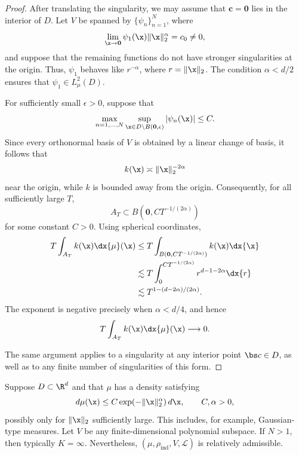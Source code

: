 \documentclass[10pt,dvipsnames]{amsart}
\begin{document}
\begin{proof}
After translating the singularity, we may assume that \(\mathbf{c}=\mathbf{0}\) lies in the
interior of \(D\). Let \(V\) be spanned by
\(\{\psi_n\}_{n=1}^N\), where
\[
  \lim_{\x \to \mathbf{0}} \psi_1(\x) \| \x\|_2^\alpha = c_0 \neq 0,
\]
and suppose that the remaining functions do not have stronger singularities
at the origin. Thus, \(\psi_1\) behaves like \(r^{-\alpha}\), where
\(r=\|\x\|_2\). The condition \(\alpha<d/2\) ensures that
\(\psi_1\in L^2_\mu(D)\).

For sufficiently small \(\epsilon>0\), suppose that
\[
  \max_{n=1,\ldots,N}
  \sup_{\x\in D\setminus B(\mathbf{0},\epsilon)}
  |\psi_n(\x)|
  \leq C.
\]
Since every orthonormal basis of \(V\) is obtained by a linear change of
basis, it follows that
\[
  k(\x) \asymp \|\x\|_2^{-2\alpha}
\]
near the origin, while \(k\) is bounded away from the origin. Consequently,
for all sufficiently large \(T\),
\[
    A_T\subset B(\mathbf{0},C T^{-1/(2\alpha)})
\]
for some constant \(C>0\). Using spherical coordinates,
\begin{align*}
  T \int_{A_T} k(\x)\dx{\mu}(\x)
  &\leq
  T \int_{B(\mathbf{0},C T^{-1/(2\alpha)})} k(\x)\dx{\x} \\
  &\lesssim
  T \int_0^{C T^{-1/(2\alpha)}} r^{d-1-2\alpha}\dx{r}\\
  &\lesssim
  T^{1-(d-2\alpha)/(2\alpha)}.
\end{align*}
The exponent is negative precisely when \(\alpha<d/4\), and hence
\[
    T\int_{A_T}k(\x)\dx{\mu}(\x)\longrightarrow0.
\]

The same argument applies to a singularity at any interior point
\(\bs c\in D\), as well as to any finite number of singularities of this
form.
\end{proof}

\begin{example}
\label{ex:freud}
Suppose $D\subset\R^d$ and that \(\mu\) has a density satisfying
\[
    d\mu(\x)\le C\exp(-\|\x\|_2^\alpha)\,d\x,
    \qquad C,\alpha>0,
\]
possibly only for \(\|\x\|_2\) sufficiently large.  This includes, for
example, Gaussian-type measures.  Let \(V\) be any
finite-dimensional polynomial subspace.  If \(N>1\), then typically \(K=\infty\).  Nevertheless, \((\mu,\rho_{\mathrm{ind}},V,\mathcal L)\) is relatively admissible.
\end{example}
\end{document}
